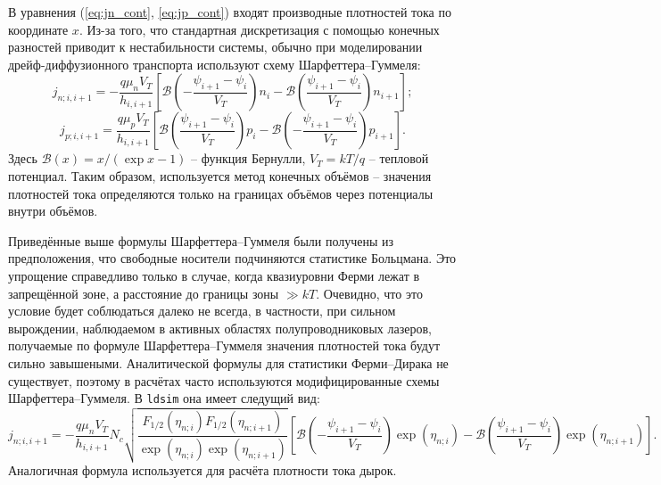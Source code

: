 \documentclass{article}
\newcommand{\ldsim}{\texttt{ldsim}}
\newcommand{\Ber}{\mathcal{B}}
\begin{document}
В уравнения (\ref{eq:jn_cont}, \ref{eq:jp_cont}) входят производные плотностей
тока по координате $x$. Из-за того, что стандартная дискретизация с помощью
конечных разностей приводит к нестабильности системы, обычно при моделировании
дрейф-диффузионного транспорта используют схему Шарфеттера--Гуммеля:
\begin{equation*}
    j_{n;i,i+1} = -\frac{q \mu_n V_T}{h_{i,i+1}}
                   \left[ \Ber\left(-\frac{\psi_{i+1}-\psi_i}{V_T}\right) n_i
                         -\Ber\left( \frac{\psi_{i+1}-\psi_i}{V_T}\right) n_{i+1}
                   \right];
\end{equation*}
\begin{equation*}
j_{p;i,i+1} = \frac{q \mu_p V_T}{h_{i,i+1}}
			  \left[ \Ber\left(  \frac{\psi_{i+1}-\psi_i}{V_T} \right) p_i
                    -\Ber\left( -\frac{\psi_{i+1}-\psi_i}{V_T} \right) p_{i+1}
              \right].
\end{equation*}
Здесь $\Ber(x) = x / (\exp{x}-1)$ -- функция Бернулли,
$V_T = kT/q$ -- тепловой потенциал.
Таким образом, используется метод конечных объёмов -- значения плотностей тока
определяются только на границах объёмов через потенциалы внутри объёмов.

Приведённые выше формулы Шарфеттера--Гуммеля были получены из предположения,
что свободные носители подчиняются статистике Больцмана. Это упрощение
справедливо только в случае, когда квазиуровни Ферми лежат в запрещённой
зоне, а расстояние до границы зоны $\gg kT$. Очевидно, что это условие
будет соблюдаться далеко не всегда, в частности, при сильном вырождении,
наблюдаемом в активных областях полупроводниковых лазеров, получаемые
по формуле Шарфеттера--Гуммеля значения плотностей тока будут сильно завышеными.
Аналитической формулы для статистики Ферми--Дирака не существует, поэтому
в расчётах часто используются модифицированные схемы Шарфеттера--Гуммеля.
В \ldsim{} она имеет следущий вид:
\begin{equation*}
j_{n;i,i+1} = -\frac{q \mu_n V_T}{h_{i,i+1}}
               N_c \sqrt{ \frac {F_{1/2}(\eta_{n;i}) F_{1/2}(\eta_{n;i+1})}
                                {\exp{(\eta_{n;i})} \exp{(\eta_{n;i+1})}} }
               \left[ \Ber\left(-\frac{\psi_{i+1}-\psi_i}{V_T}\right) \exp{(\eta_{n;i})}
                     -\Ber\left( \frac{\psi_{i+1}-\psi_i}{V_T}\right) \exp{(\eta_{n;i+1})}
               \right].
\end{equation*}
Аналогичная формула используется для расчёта плотности тока дырок.
\end{document}
